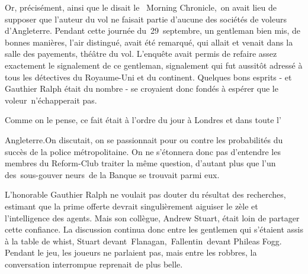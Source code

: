 \documentclass[]{book}
\begin{document}
               Or, précisément, ainsi que le disait le 
               Morning Chronicle, on avait lieu de supposer que l'auteur du vol ne faisait partie
               d'aucune des sociétés de voleurs d'Angleterre. Pendant cette journée du 29 septembre, un gentleman bien mis, de bonnes 
               manières, l'air distingué, avait été remarqué, qui allait et venait dans la salle des 
               payements, théâtre du vol. L'enquête avait
               permis de refaire assez exactement le signalement de ce gentleman, signalement
               qui fut aussitôt adressé à tous les détectives du Royaume-Uni et du continent. 
               Quelques bons esprits - et Gauthier Ralph
               était du nombre - se croyaient donc fondés à espérer que le voleur n'échapperait
               pas.
            
               Comme on le pense, ce fait était à l'ordre du jour à Londres et dans toute l' 
                  
               Angleterre.On discutait, on se passionnait
               pour ou contre les probabilités du succès 
               de la police métropolitaine. On ne s'étonnera donc pas d'entendre les membres du 
               Reform-Club traiter la même question, 
               d'autant plus que l'un des sous-gouver
               neurs de la Banque se trouvait parmi
               eux.
            
               L'honorable Gauthier Ralph ne voulait 
               pas douter du résultat des recherches, estimant que la prime offerte devrait singulièrement aiguiser le zèle et l'intelligence
               des agents. Mais son collègue, Andrew 
               Stuart, était loin de partager cette confiance. La discussion continua donc entre
               les gentlemen qui s'étaient assis à la table
               de whist, Stuart devant Flanagan, Fallentin devant Phileas Fogg. Pendant le jeu,
               les joueurs ne parlaient pas, mais entre
               les robbres, la conversation interrompue
               reprenait de plus belle.
            
\end{document}
